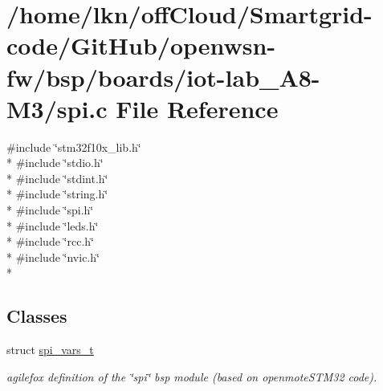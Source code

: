 \hypertarget{iot-lab___a8-_m3_2spi_8c}{}\section{/home/lkn/off\+Cloud/\+Smartgrid-\/code/\+Git\+Hub/openwsn-\/fw/bsp/boards/iot-\/lab\+\_\+\+A8-\/\+M3/spi.c File Reference}
\label{iot-lab___a8-_m3_2spi_8c}
{\ttfamily \#include \char`\"{}stm32f10x\+\_\+lib.\+h\char`\"{}}\\*
{\ttfamily \#include \char`\"{}stdio.\+h\char`\"{}}\\*
{\ttfamily \#include \char`\"{}stdint.\+h\char`\"{}}\\*
{\ttfamily \#include \char`\"{}string.\+h\char`\"{}}\\*
{\ttfamily \#include \char`\"{}spi.\+h\char`\"{}}\\*
{\ttfamily \#include \char`\"{}leds.\+h\char`\"{}}\\*
{\ttfamily \#include \char`\"{}rcc.\+h\char`\"{}}\\*
{\ttfamily \#include \char`\"{}nvic.\+h\char`\"{}}\\*
\subsection*{Classes}
\begin{DoxyCompactItemize}
\item 
struct \hyperlink{structspi__vars__t}{spi\+\_\+vars\+\_\+t}
\begin{DoxyCompactList}\small\item\em agilefox definition of the \char`\"{}spi\char`\"{} bsp module (based on openmote\+S\+T\+M32 code). \end{DoxyCompactList}\end{DoxyCompactItemize}
